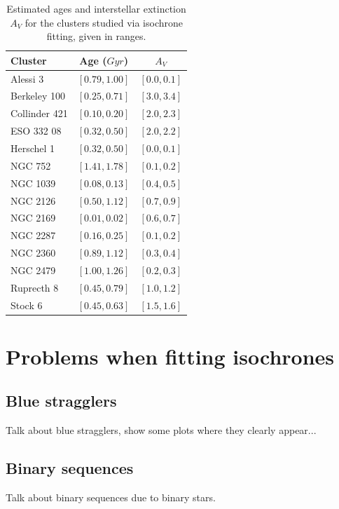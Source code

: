 \documentclass[twocolumn]{revtex4}
\begin{document}
\begin{table}[h!]
\begin{tabular}{|l|c|c|}
\hline
\textbf{Cluster} & \textbf{Age ($\si{Gyr}$)} & \textbf{$A_V$} \\
\hline
Alessi 3 & $[0.79, 1.00]$ & $[0.0, 0.1]$ \\
\hline
Berkeley 100 & $[0.25, 0.71]$ & $[3.0, 3.4]$ \\
\hline
Collinder 421 & $[0.10, 0.20]$ & $[2.0, 2.3]$ \\
\hline
ESO 332 08 & $[0.32, 0.50]$ & $[2.0, 2.2]$ \\
\hline
Herschel 1 & $[0.32, 0.50]$ & $[0.0, 0.1]$  \\
\hline
NGC 752 & $[1.41, 1.78]$ & $[0.1, 0.2]$  \\
\hline
NGC 1039 & $[0.08, 0.13]$ & $[0.4, 0.5]$  \\
\hline
NGC 2126 & $[0.50, 1.12]$ & $[0.7, 0.9]$ \\
\hline
NGC 2169 & $[0.01, 0.02]$ & $[0.6, 0.7]$ \\
\hline
NGC 2287 & $[0.16, 0.25]$ & $[0.1, 0.2]$ \\
\hline
NGC 2360 & $[0.89, 1.12]$ & $[0.3, 0.4]$ \\
\hline
NGC 2479 & $[1.00, 1.26]$ & $[0.2, 0.3]$ \\
\hline
Ruprecth 8 & $[0.45, 0.79]$ & $[1.0, 1.2]$ \\
\hline
Stock 6 & $[0.45, 0.63]$ & $[1.5, 1.6]$ \\
\hline
\end{tabular}
\caption{Estimated ages and interstellar extinction $A_V$ for the clusters studied via isochrone fitting, given in ranges.}
\label{tab:fitting-results}
\end{table}

\section{Problems when fitting isochrones}
\subsection{Blue stragglers}
Talk about blue stragglers, show some plots where they clearly appear...

\subsection{Binary sequences}
Talk about binary sequences due to binary stars.
\end{document}
